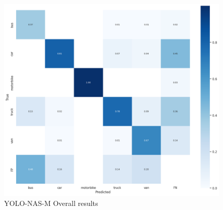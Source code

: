 \begin{figure}[H]
    \centering
    \includegraphics[width=\linewidth]{tex/img/M-confiusion.png}
    \caption{YOLO-NAS-M Overall results }
    \label{fig:ConfusionMatrixY-N-S}
\end{figure}

